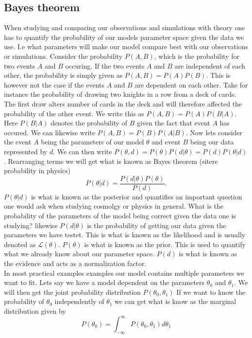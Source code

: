 \subsection{Bayes theorem}
When studying and comparing our observations and simulations with theory one has
to quantify the probability of our models parameter space given the data we use.
I.e what parameters will make our model compare best with our observations or
simulations. Consider the probability $P(A, B)$, which is the probability for two events $A$ and $B$ occuring.
If the two events $A$ and $B$ are independent of each other, the probability is simply given as $P(A, B) = P(A)P(B)$.
This is however not the case if the events $A$ and $B$ are dependent on each other. Take for instance the probability
of drawing two knights in a row from a deck of cards. The first draw alters number of cards in the deck and will therefore affected
the probability of the other event. We write this as $P(A,B) = P(A)P(B\vert A)$. Here $P(B\vert A)$ denotes the probability of $B$ given the fact that 
event $A$ has occured. We can likewise write $P(A,B) = P(B)P(A\vert B)$. Now lets consider the event $A$ being the parameters of our model $\theta$ and
event $B$ being our data represented by $d$. We can then write $P(\theta,d) = P(\theta)P(d\vert \theta)=P(d)P(\theta\vert d)$. Rearranging terms we will get
what is known as Bayes theorem (sitere probability in physics)
\begin{equation}\label{eq:bayes}
    P(\theta\vert d) = \frac{P(d\vert \theta)P(\theta)}{P(d)}.
\end{equation}
$P(\theta\vert d)$ is what is known as the posterior and quantifies an
important question one would ask when studying cosmolgy or physics in general. What is the probability
of the parameters of the model being correct given the data one is studying? likewise $P(d\vert\theta)$ is the
probability of getting our data given the parameters we have testet. This is what is known as
the likelihood and is usually denoted as $\mathcal{L}(\theta)$. $P(\theta)$ is what is
known as the prior. This is used to quantify what we already know about our
parameter space. $P(d)$ is what is known as the evidence and acts as a
normalization factor. \\

In most practical examples examples our model contains multiple parameters we want to fit. Lets say we have a model
dependent on the parameters $\theta_0$ and $\theta_1$. We will then get the joint probability distribution $P(\theta_0, \theta_1)$
If we want to know the probability of $\theta_0$ independently of $\theta_1$ we can get what is know as the marginal distribution given by
\begin{equation}
    P(\theta_0)=\int_{-\infty}^{\infty}P(\theta_0, \theta_1)d\theta_1
\end{equation}

